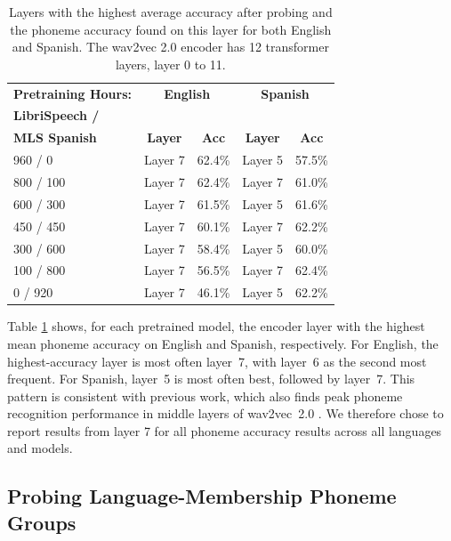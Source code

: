 \begin{table}[h]
\centering
\begin{tabular}{l|cc|cc}
\toprule
\textbf{Pretraining Hours:} & \multicolumn{2}{c}{\textbf{English}} & \multicolumn{2}{c}{\textbf{Spanish}} \\
\textbf{LibriSpeech /} & & & & \\
\textbf{MLS Spanish } &  \textbf{Layer } & \textbf{Acc } & \textbf{Layer } & \textbf{Acc } \\
\midrule
960 / 0 & Layer 7 & 62.4\% & Layer 5 & 57.5\% \\
800 / 100 & Layer 7 & 62.4\% & Layer 7 & 61.0\% \\
600 / 300 & Layer 7 & 61.5\% & Layer 5 & 61.6\% \\
450 / 450 & Layer 7 & 60.1\% & Layer 7 & 62.2\% \\
300 / 600 & Layer 7 & 58.4\% & Layer 5 & 60.0\% \\
100 / 800 & Layer 7 & 56.5\% & Layer 7 & 62.4\% \\
0 / 920 & Layer 7 & 46.1\% & Layer 5 & 62.2\% \\
\bottomrule
\end{tabular}
\caption{Layers with the highest average accuracy after probing and the phoneme accuracy found on this layer for both English and Spanish. The wav2vec 2.0 encoder has 12 transformer layers, layer 0 to 11.}
\label{ed_tab:best_layer_average_accuracy}
\end{table}

Table \ref{ed_tab:best_layer_average_accuracy} shows, for each pretrained model, the encoder layer with the highest mean phoneme accuracy on English and Spanish, respectively. For English, the highest-accuracy layer is most often layer~7, with layer~6 as the second most frequent. For Spanish, layer~5 is most often best, followed by layer~7. This pattern is consistent with previous work, which also finds peak phoneme recognition performance in middle layers of wav2vec~2.0 \cite{pasad2021layer,english2022domain}. We therefore chose to report results from layer 7 for all phoneme accuracy results across all languages and models.

\subsection{Probing Language-Membership Phoneme Groups}\label{ed_subsec:lang_membership_groups}

